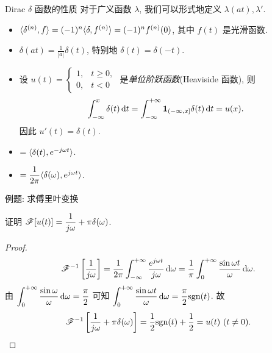 \begin{frame}{Dirac $\delta$ 函数的性质}
对于广义函数 $\lambda$, 我们可以形式地定义 $\lambda(at),\lambda'$.
\onslide<+->
\begin{itemize}
\item $\langle{\delta^{(n)},f}\rangle=(-1)^n\langle{\delta,f^{(n)}}\rangle=(-1)^nf^{(n)}(0)$, 其中 $f(t)$ 是光滑函数.
\item $\delta(at)=\frac1{|a|}\delta(t)$, 特别地 $\delta(t)=\delta(-t)$.
\item 设 $u(t)=\begin{cases}1,&t\ge0,\\0,&t<0\end{cases}$ 是\emph{单位阶跃函数}(Heaviside 函数), 则
\[\int_{-\infty}^x\delta(t)\,\mathrm{d} t=\int_{-\infty}^{+\infty}\textbf{1}_{(-\infty,x]}\delta(t)\,\mathrm{d} t=u(x).\]
因此 $u'(t)=\delta(t)$.
\item \abox{$\msf[\delta(t)]$}$=\langle{\delta(t),e^{-j\omega t}}\rangle$.
\item{}$=\dfrac1{2\pi}\langle{\delta(\omega),e^{j\omega t}}\rangle$.
\end{itemize}
\end{frame}


\begin{frame}{例题: 求傅里叶变换}
\begin{example}
证明 \alert{$\mathscr{F}[u(t)]=\dfrac1{j\omega}+\pi\delta(\omega)$}.
\end{example}
\begin{proof}
\[\mathscr{F}^{-1}\left[\frac1{j\omega}\right]
=\frac1{2\pi}\int_{-\infty}^{+\infty}\frac{e^{j\omega t}}{j\omega} \,\mathrm{d}\omega
=\frac1\pi\int_0^{+\infty}\frac{\sin{\omega t}}{\omega} \,\mathrm{d}\omega.\]
\onslide<+->
由 $\displaystyle\int_0^{+\infty}\frac{\sin\omega}\omega \,\mathrm{d}\omega=\dfrac\pi2$
可知 $\displaystyle\int_0^{+\infty}\frac{\sin{\omega t}}\omega \,\mathrm{d}\omega=\frac\pi2{\mathrm{sgn}}(t)$.
\onslide<+->
故
\[\mathscr{F}^{-1} \left[\frac1{j\omega}+\pi\delta(\omega)\right]
=\frac12{\mathrm{sgn}}(t)+\frac12=u(t)\ (t\neq 0).\qedhere\]
\end{proof}
\end{frame}
